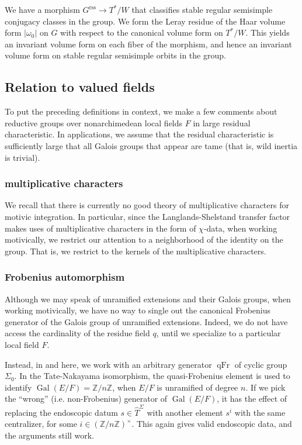\documentclass[12pt]{amsart}
\newcommand{\op}[1]{\operatorname{#1}}
\newcommand{\ring}[1]{{\mathbb #1}}
\newcommand{\reg}{\mathrm{rss}}
\theoremstyle{plain}
\theoremstyle{definition}
\begin{document}
We have a morphism $G^\reg\to T^*/W$ that classifies stable regular
semisimple conjugacy classes in the group.  We form the Leray residue
of the Haar volume form $|\omega_0|$ on $G$ with respect to the
canonical volume form on $T^*/W$.  This yields an invariant volume
form on each fiber of the morphism, and hence an invariant volume form
on stable regular semisimple orbits in the group.



\subsection{Relation to valued fields}

To put the preceding definitions in context, we make a few comments
about reductive groups over nonarchimedean local fields $F$ in large
residual characteristic.  In applications, we assume that the residual
characteristic is sufficiently large that all Galois groups that
appear are tame (that is, wild inertia is trivial).


\subsubsection{multiplicative characters}

We recall that there is currently no good theory of multiplicative
characters for motivic integration.  In particular, since the
Langlands-Shelstand transfer factor makes uses of multiplicative
characters in the form of $\chi$-data, when working motivically,
we restrict our attention to a neighborhood of the identity on the
group.  That is, we restrict to the kernels of the multiplicative
characters.

\subsubsection{Frobenius automorphism}

Although we may speak of unramified extensions and their Galois
groups, when working motivically, we have no way to single out the
canonical Frobenius generator of the Galois group of unramified
extensions.  Indeed, we do not have access the cardinality of the
residue field $q$, until we specialize to a particular local field
$F$.

Instead, in \cite{CHL} and here, we work with an arbitrary generator
$\op{qFr}$ of cyclic group $\Sigma_0$.  In the Tate-Nakayama
isomorphism, the quasi-Frobenius element is used to identify
$\op{Gal}(E/F) = \ring{Z}/n\ring{Z}$, when $E/F$ is unramified of
degree $n$.  If we pick the ``wrong'' (i.e. non-Frobenius) generator
of $\op{Gal}(E/F)$, it has the effect of replacing the endoscopic
datum $s\in \hat T^\Sigma$ with another element $s^i$ with the same
centralizer, for some $i\in (\ring{Z}/n\ring{Z})^\times$.  This again
gives valid endoscopic data, and the arguments still work.
\end{document}
